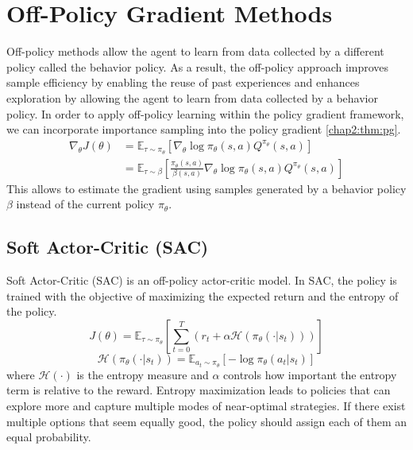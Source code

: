 \section{Off-Policy Gradient Methods} \label{chap2:sec3}

Off-policy methods allow the agent to learn from data collected by a different policy called the behavior policy.
As a result, the off-policy approach improves sample efficiency by enabling the reuse of past experiences and enhances exploration by allowing the agent to learn from data collected by a behavior policy.
In order to apply off-policy learning within the policy gradient framework, we can incorporate importance sampling into the policy gradient \cref{chap2:thm:pg}.
\begin{equation}
  \begin{aligned}
    \nabla_\theta J(\theta)
    &= \mathbb{E}_{\tau \sim \pi_\theta} [\nabla_\theta \log \pi_\theta(s, a) Q^{\pi_\theta}(s, a)] \\
    &= \mathbb{E}_{\tau \sim \beta} \left[ \frac{\pi_\theta(s, a)}{\beta(s, a)} \nabla_\theta \log \pi_\theta(s, a) Q^{\pi_\theta}(s, a) \right]
  \end{aligned}
\end{equation}
This allows to estimate the gradient using samples generated by a behavior policy $\beta$ instead of the current policy $\pi_\theta$.

\subsection{Soft Actor-Critic (SAC)}

Soft Actor-Critic (SAC) \cite{SAC1, SAC2, SAC3} is an off-policy actor-critic model.
In SAC, the policy is trained with the objective of maximizing the expected return and the entropy of the policy.
\begin{equation}
  J(\theta) = \mathbb{E}_{\tau \sim \pi_\theta} \left[ \sum^T_{t = 0} (r_t + \alpha \mathcal{H}(\pi_\theta(\cdot|s_t))) \right]
\end{equation}
\begin{equation}
  \mathcal{H}(\pi_\theta(\cdot|s_t)) = \mathbb{E}_{a_t \sim \pi_\theta}[-\log \pi_\theta(a_t|s_t)]
\end{equation}
where $\mathcal{H}(\cdot)$ is the entropy measure and $\alpha$ controls how important the entropy term is relative to the reward.
Entropy maximization leads to policies that can explore more and capture multiple modes of near-optimal strategies.
If there exist multiple options that seem equally good, the policy should assign each of them an equal probability.